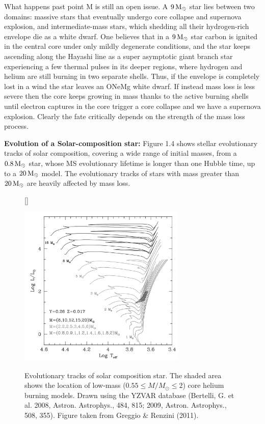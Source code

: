 \documentclass[a4paper,10pt]{article}
\begin{document}
{\noindent}What happens past point M is still an open issue. A $9\,{\rm M_\odot}$ star lies between two domains: massive stars that eventually undergo core collapse and supernova explosion, and intermediate-mass stars, which shedding all their hydrogen-rich envelope die as a white dwarf. One believes that in a $9\,{\rm M_\odot}$ star carbon is ignited in the central core under only mildly degenerate conditions, and the star keeps ascending along the Hayashi line as a super asymptotic giant branch star experiencing a few thermal pulses in its deeper regions, where hydrogen and helium are still burning in two separate shells. Thus, if the envelope is completely lost in a wind the star leaves an ONeMg white dwarf. If instead mass loss is less severe then the core keeps growing in mass thanks to the active burning shells until electron captures in the core trigger a core collapse and we have a supernova explosion. Clearly the fate critically depends on the strength of the mass loss process.

{\noindent}\textbf{Evolution of a Solar-composition star:} Figure 1.4 shows stellar evolutionary tracks of solar composition, covering a wide range of initial masses, from a $0.8\,{\rm M_\odot}$ star, whose MS evolutionary lifetime is longer than one Hubble time, up to a $20\,{\rm M_\odot}$ model. The evolutionary tracks of stars with mass greater than $20\,{\rm M_\odot}$ are heavily affected by mass loss.

\begin{figure}[h]
    [\FBwidth]
    {\caption{\footnotesize{Evolutionary tracks of solar composition star. The shaded area shows the location of low-mass ($0.55\leq M/M_\odot\leq2$) core helium burning models. Drawn using the YZVAR database (Bertelli, G. et al. 2008, Astron. Astrophys., 484, 815; 2009, Astron. Astrophys., 508, 355). Figure taken from Greggio \& Renzini (2011).}}
    \label{fig:hrdsolar}}
    {\includegraphics[width=8cm]{figures/HRD_Solar.png}}
\end{figure}
\end{document}
